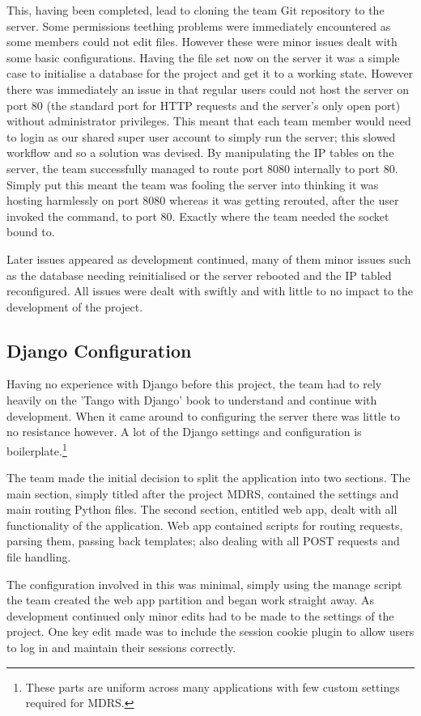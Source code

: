 \documentclass{l3proj}
\begin{document}
This, having been completed, lead to cloning the team Git repository to the server. Some permissions teething problems were immediately encountered as some members could not edit files. However these were minor issues dealt with some basic configurations.
Having the file set now on the server it was a simple case to initialise a database for the project and get it to a working state. However there was immediately an issue in that regular users could not host the server on port 80 (the standard port for HTTP requests and the server's only open port) without administrator privileges. This meant that each team member would need to login as our shared super user account to simply run the server; this slowed workflow and so a solution was devised. By manipulating the IP tables on the server, the team successfully managed to route port 8080 internally to port 80. Simply put this meant the team was fooling the server into thinking it was hosting harmlessly on port 8080 whereas it was getting rerouted, after the user invoked the command, to port 80. Exactly where the team needed the socket bound to.

Later issues appeared as development continued, many of them minor issues such as the database needing reinitialised or the server rebooted and the IP tabled reconfigured. All issues were dealt with swiftly and with little to no impact to the development of the project.

\subsection{Django Configuration}		Having no experience with Django before this project, the team had to rely heavily on the 'Tango with Django' book\cite{tangoWithDjango} to understand and continue with development. When it came around to configuring the server there was little to no resistance however. A lot of the Django settings and configuration is boilerplate.\footnote{These parts are uniform across many applications with few custom settings required for MDRS.}

The team made the initial decision to split the application into two sections. The main section, simply titled after the project MDRS, contained the settings and main routing Python files. The second section, entitled web app, dealt with all functionality of the application. Web app contained scripts for routing requests, parsing them, passing back templates; also dealing with all POST requests and file handling.

The configuration involved in this was minimal, simply using the manage script the team created the web app partition and began work straight away. As development continued only minor edits had to be made to the settings of the project. One key edit made was to include the session cookie plugin to allow users to log in and maintain their sessions correctly.
\end{document}
